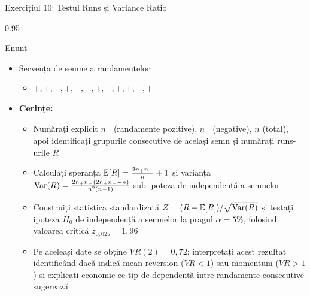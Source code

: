 \documentclass[9pt, aspectratio=169, t]{beamer}
\begin{document}
\begin{frame}[shrink=25]{Exercițiul 10: Testul Runs și Variance Ratio}
\begin{cminipage}{0.95\textwidth}
\begin{block}{Enunț}
\begin{itemize}\setlength{\itemsep}{0pt}
    \item Secvența de semne a randamentelor:
    \begin{itemize}\setlength{\itemsep}{0pt}
        \item $+, +, -, +, -, -, +, -, +, +, -, +$
    \end{itemize}
    \item \textbf{Cerințe:}
    \begin{itemize}\setlength{\itemsep}{0pt}
        \item Numărați explicit $n_+$ (randamente pozitive), $n_-$ (negative), $n$ (total), apoi identificați grupurile consecutive de același semn și numărați runs-urile $R$
        \item Calculați speranța $\mathbb{E}[R] = \frac{2n_+n_-}{n}+1$ și varianța $\text{Var}(R) = \frac{2n_+n_-(2n_+n_- - n)}{n^2(n-1)}$ sub ipoteza de independență a semnelor
        \item Construiți statistica standardizată $Z = (R - \mathbb{E}[R])/\sqrt{\text{Var}(R)}$ și testați ipoteza $H_0$ de independență a semnelor la pragul $\alpha = 5\%$, folosind valoarea critică $z_{0{,}025} = 1{,}96$
        \item Pe aceleași date se obține $VR(2) = 0{,}72$; interpretați acest rezultat identificând dacă indică mean reversion ($VR < 1$) sau momentum ($VR > 1$) și explicați economic ce tip de dependență între randamente consecutive sugerează
    \end{itemize}
\end{itemize}
\end{block}
\end{cminipage}
\end{frame}
\end{document}
